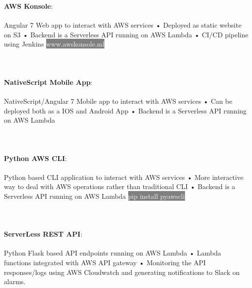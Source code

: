 \documentclass[9pt]{developercv} %
\begin{document}
\begin{minipage}[t]{1\textwidth} %
	\vspace{-\baselineskip} %
	
  \textbf{AWS Konsole}:\\\\Angular 7 Web app to interact with AWS services • Deployed as static website on S3 • Backend is a Serverless API running on AWS Lambda • CI/CD pipeline using Jenkins  \colorbox{gray}{\textcolor{white}{www.awskonsole.ml}}\\\\ \\\\
\textbf{NativeScript Mobile App}:\\\\NativeScript/Angular 7 Mobile app to interact with AWS services • Can be deployed both as a IOS and Android App • Backend is a Serverless API running on AWS Lambda\\\\\\\\
    \textbf{Python AWS CLI}:\\\\Python based CLI application to interact with AWS services • More interactive way to deal with AWS operations rather than traditional CLI • Backend is a Serverless API running on AWS Lambda \colorbox{gray}{\textcolor{white}{pip install pyawscli}}\\\\\\\\
        \textbf{ServerLess REST API}:\\\\Python Flask based API endpoints running on AWS Lambda • Lambda functions integrated with AWS API gateway • Monitoring the API responses/logs using AWS Cloudwatch and generating notifications to Slack on alarms.\\\\\\\\

\end{minipage}
\end{document}
